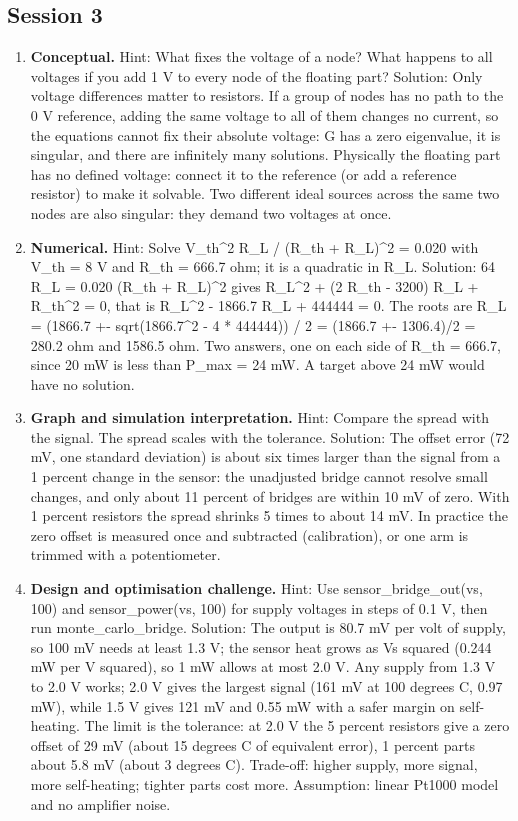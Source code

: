 \documentclass[11pt,a4paper]{article}
\begin{document}
\subsection*{Session 3}
\begin{enumerate}[nosep]
\item \textbf{Conceptual.} Hint: What fixes the voltage of a node? What happens to all voltages if you add 1 V to every node of the floating part? Solution: Only voltage differences matter to resistors. If a group of nodes has no path to the 0 V reference, adding the same voltage to all of them changes no current, so the equations cannot fix their absolute voltage: G has a zero eigenvalue, it is singular, and there are infinitely many solutions. Physically the floating part has no defined voltage: connect it to the reference (or add a reference resistor) to make it solvable. Two different ideal sources across the same two nodes are also singular: they demand two voltages at once.
\item \textbf{Numerical.} Hint: Solve V\_th\textasciicircum{}2 R\_L / (R\_th + R\_L)\textasciicircum{}2 = 0.020 with V\_th = 8 V and R\_th = 666.7 ohm; it is a quadratic in R\_L. Solution: 64 R\_L = 0.020 (R\_th + R\_L)\textasciicircum{}2 gives R\_L\textasciicircum{}2 + (2 R\_th - 3200) R\_L + R\_th\textasciicircum{}2 = 0, that is R\_L\textasciicircum{}2 - 1866.7 R\_L + 444444 = 0. The roots are R\_L = (1866.7 +- sqrt(1866.7\textasciicircum{}2 - 4 * 444444)) / 2 = (1866.7 +- 1306.4)/2 = 280.2 ohm and 1586.5 ohm. Two answers, one on each side of R\_th = 666.7, since 20 mW is less than P\_max = 24 mW. A target above 24 mW would have no solution.
\item \textbf{Graph and simulation interpretation.} Hint: Compare the spread with the signal. The spread scales with the tolerance. Solution: The offset error (72 mV, one standard deviation) is about six times larger than the signal from a 1 percent change in the sensor: the unadjusted bridge cannot resolve small changes, and only about 11 percent of bridges are within 10 mV of zero. With 1 percent resistors the spread shrinks 5 times to about 14 mV. In practice the zero offset is measured once and subtracted (calibration), or one arm is trimmed with a potentiometer.
\item \textbf{Design and optimisation challenge.} Hint: Use sensor\_bridge\_out(vs, 100) and sensor\_power(vs, 100) for supply voltages in steps of 0.1 V, then run monte\_carlo\_bridge. Solution: The output is 80.7 mV per volt of supply, so 100 mV needs at least 1.3 V; the sensor heat grows as Vs squared (0.244 mW per V squared), so 1 mW allows at most 2.0 V. Any supply from 1.3 V to 2.0 V works; 2.0 V gives the largest signal (161 mV at 100 degrees C, 0.97 mW), while 1.5 V gives 121 mV and 0.55 mW with a safer margin on self-heating. The limit is the tolerance: at 2.0 V the 5 percent resistors give a zero offset of 29 mV (about 15 degrees C of equivalent error), 1 percent parts about 5.8 mV (about 3 degrees C). Trade-off: higher supply, more signal, more self-heating; tighter parts cost more. Assumption: linear Pt1000 model and no amplifier noise.
\end{enumerate}
\end{document}
